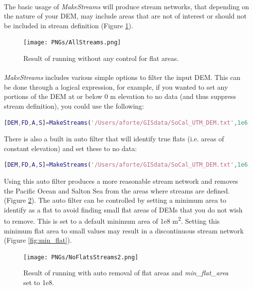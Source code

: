 \paragraph{}The basic usage of \textit{MakeStreams} will produce stream networks, that depending on the nature of your DEM, may include areas that are not of interest or should not be included in stream definition (Figure \ref{fig:AllStreams}).

\begin{figure}[H]
	\texttt{[image: PNGs/AllStreams.png]}
	\caption{Result of running  without any control for flat areas.}
	\label{fig:AllStreams}
\end{figure}

\paragraph{}\textit{MakeStreams} includes various simple options to filter the input DEM. This can be done through a logical expression, for example, if you wanted to set any portions of the DEM at or below 0 m elevation to no data (and thus suppress stream definition), you could use the following:

\begin{lstlisting}[language=Matlab]
[DEM,FD,A,S]=MakeStreams('/Users/aforte/GISdata/SoCal_UTM_DEM.txt',1e6,'no_data_exp','DEM<=0');
\end{lstlisting}

\noindent
There is also a built in auto filter that will identify true flats (i.e. areas of constant elevation) and set these to no data:

\begin{lstlisting}[language=Matlab]
[DEM,FD,A,S]=MakeStreams('/Users/aforte/GISdata/SoCal_UTM_DEM.txt',1e6,'no_data_exp','auto');
\end{lstlisting}

\noindent
Using this auto filter produces a more reasonable stream network and removes the Pacific Ocean and Salton Sea from the areas where streams are defined. (Figure \ref{fig:NoFlatsStreams}). The auto filter can be controlled by setting a minimum area to identify as a flat to avoid finding small flat areas of DEMs that you do not wish to remove. This is set to a default minimum area of 1e8 m\textsuperscript{2}. Setting this minimum flat area to small values may result in a discontinuous stream network (Figure \ref{fig:min_flat}).

\begin{figure}[H]
	\texttt{[image: PNGs/NoFlatsStreams2.png]}
	\caption{Result of running  with auto removal of flat areas and \textit{min\_flat\_area} set to 1e8.}
	\label{fig:NoFlatsStreams}
\end{figure}

